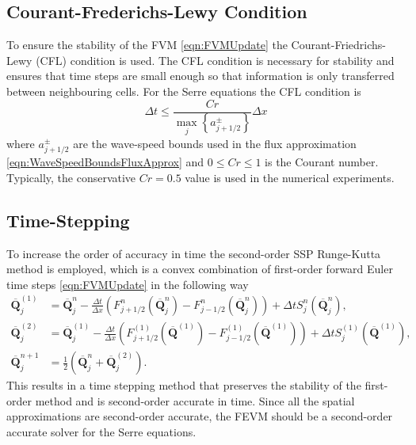\documentclass[times]{elsarticle}
\newcommand{\vecn}[1]{\boldsymbol{#1}}
\begin{document}
\subsection{Courant-Frederichs-Lewy Condition}
To ensure the stability of the FVM \eqref{eqn:FVMUpdate} the Courant-Friedrichs-Lewy (CFL) condition \cite{Courant-etal-1967-215} is used. The CFL condition is necessary for stability and ensures that time steps are small enough so that information is only transferred between neighbouring cells. For the Serre equations the CFL condition is 
\begin{equation}
\Delta t \le \frac{Cr }{\max_{j} \left\lbrace a^\pm_{j+1/2} \right\rbrace} \Delta x
\label{eqn:CFLcond}
\end{equation}
where $a^\pm_{j+1/2} $ are the wave-speed bounds used in the flux approximation \eqref{eqn:WaveSpeedBoundsFluxApprox} and $0\le Cr \le 1$ is the Courant number. Typically, the conservative $Cr = 0.5$ value is used in the numerical experiments.

\subsection{Time-Stepping}
To increase the order of accuracy in time the second-order SSP Runge-Kutta method \cite{Gottlieb-etal-2003-89} is employed, which is a convex combination of first-order forward Euler time steps \eqref{eqn:FVMUpdate} in the following way
\begin{subequations}
	\begin{align}
\overline{\vecn{Q} }^{(1)}_j &= \overline{\vecn{Q} }^{n}_j - \frac{\Delta t}{\Delta x} \left(F^n_{j+1/2}\left(\overline{\vecn{Q} }^{n}_j \right) - F^n_{j-1/2}\left(\overline{\vecn{Q} }^{n}_j \right) \right) + \Delta t S^n_j\left(\overline{\vecn{Q} }^{n}_j\right),\\
\overline{\vecn{Q} }^{(2)}_j &= \overline{\vecn{Q} }^{(1)}_j - \frac{\Delta t}{\Delta x} \left(F^{(1)}_{j+1/2}\left(\overline{\vecn{Q} }^{(1)} \right) - F^{(1)}_{j-1/2}\left(\overline{\vecn{Q} }^{(1)} \right) \right) + \Delta t S^{(1)}_j\left(\overline{\vecn{Q} }^{(1)} \right),\\
	\overline{\vecn{Q} }^{n+1}_j &= \frac{1}{2} \left( \overline{\vecn{Q} }^n_j +  \overline{\vecn{Q} }_j^{(2)}  \right).
	\end{align}
	\label{eqn:SSPRKStep1}
\end{subequations}
This results in a time stepping method that preserves the stability of the first-order method and is second-order accurate in time. Since all the spatial approximations are second-order accurate, the FEVM should be a second-order accurate solver for the Serre equations. 
\end{document}
